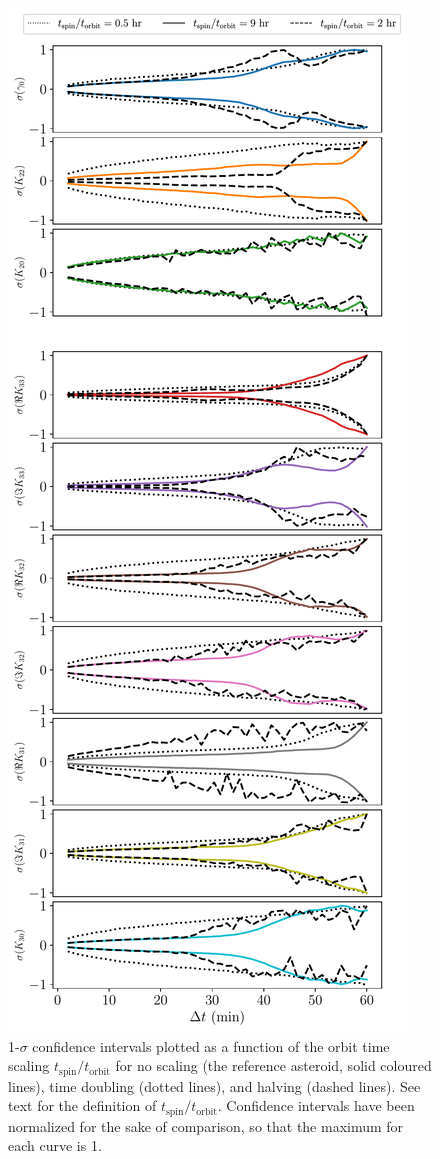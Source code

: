 \documentclass[fleqn,usenatbib]{mnras}
\begin{document}
\begin{figure}
  \centering
  \includegraphics[height=0.89\textheight]{figs/cad-speed.pdf}
  \caption{1-$\sigma$ confidence intervals plotted as a function of the orbit time scaling $t_\text{spin}/t_\text{orbit}$ for no scaling (the reference asteroid, solid coloured lines), time doubling (dotted lines), and halving (dashed lines). See text for the definition of $t_\text{spin}/t_\text{orbit}$. Confidence intervals have been normalized for the sake of comparison, so that the maximum for each curve is 1.}
  \label{fig:cad-speed}
\end{figure}
\end{document}
